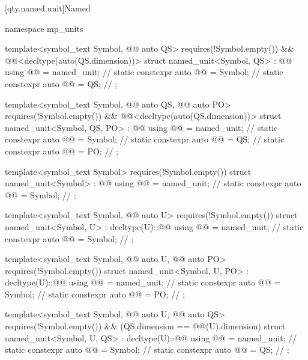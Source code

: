 [qty.named.unit]{Named}

\begin{codeblock}
namespace mp_units {

template<symbol_text Symbol, @@ auto QS>
  requires(!Symbol.empty()) && @@<decltype(auto(QS.dimension))>
struct named_unit<Symbol, QS> : @@ {
  using @@ = named_unit;              // \expos
  static constexpr auto @@ = Symbol;     // \expos
  static constexpr auto @@ = QS;  // \expos
};

template<symbol_text Symbol, @@ auto QS, @@ auto PO>
  requires(!Symbol.empty()) && @@<decltype(auto(QS.dimension))>
struct named_unit<Symbol, QS, PO> : @@ {
  using @@ = named_unit;              // \expos
  static constexpr auto @@ = Symbol;     // \expos
  static constexpr auto @@ = QS;  // \expos
  static constexpr auto @@ = PO;   // \expos
};

template<symbol_text Symbol>
  requires(!Symbol.empty())
struct named_unit<Symbol> : @@ {
  using @@ = named_unit;              // \expos
  static constexpr auto @@ = Symbol;     // \expos
};

template<symbol_text Symbol, @@ auto U>
  requires(!Symbol.empty())
struct named_unit<Symbol, U> : decltype(U)::@@ {
  using @@ = named_unit;              // \expos
  static constexpr auto @@ = Symbol;     // \expos
};

template<symbol_text Symbol, @@ auto U, @@ auto PO>
  requires(!Symbol.empty())
struct named_unit<Symbol, U, PO> : decltype(U)::@@ {
  using @@ = named_unit;              // \expos
  static constexpr auto @@ = Symbol;     // \expos
  static constexpr auto @@ = PO;   // \expos
};

template<symbol_text Symbol, @@ auto U, @@ auto QS>
  requires(!Symbol.empty()) && (QS.dimension == @@(U).dimension)
struct named_unit<Symbol, U, QS> : decltype(U)::@@ {
  using @@ = named_unit;              // \expos
  static constexpr auto @@ = Symbol;     // \expos
  static constexpr auto @@ = QS;  // \expos
};

}
\end{codeblock}
